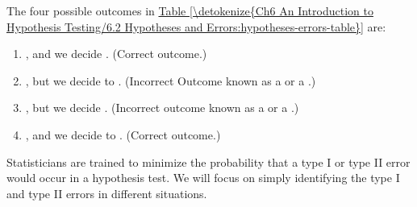 \documentclass[letterpaper,10pt,english]{jupyterBook}
\begin{document}
\sphinxAtStartPar
The four possible outcomes in \hyperref[\detokenize{Ch6 An Introduction to Hypothesis Testing/6.2 Hypotheses and Errors:hypotheses-errors-table}]{Table \ref{\detokenize{Ch6 An Introduction to Hypothesis Testing/6.2 Hypotheses and Errors:hypotheses-errors-table}}} are:
\begin{enumerate}
%
\item {} 
\sphinxAtStartPar
{}, and we decide . (Correct outcome.)

\item {} 
\sphinxAtStartPar
{}, but we decide to . (Incorrect Outcome known as a  or a .)

\item {} 
\sphinxAtStartPar
{}, but we decide . (Incorrect outcome known as a  or a .)

\item {} 
\sphinxAtStartPar
{}, and we decide to . (Correct outcome.)

\end{enumerate}

\sphinxAtStartPar
Statisticians are trained to minimize the probability that a type I or type II error would occur in a hypothesis test. We will focus on simply identifying the type I and type II errors in different situations.
\end{document}
